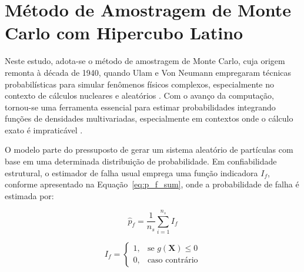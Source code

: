 



\section{Método de Amostragem de Monte Carlo com Hipercubo Latino}

Neste estudo, adota-se o método de amostragem de Monte Carlo, cuja origem remonta à década de 1940, quando Ulam e Von Neumann empregaram técnicas probabilísticas para simular fenômenos físicos complexos, especialmente no contexto de cálculos nucleares e aleatórios \cite{ulam_s_monte_1948}. 
Com o avanço da computação, tornou-se uma ferramenta essencial para estimar probabilidades integrando funções de densidades multivariadas, especialmente em contextos onde o cálculo exato é impraticável \cite{song_monte_2023}. 

O modelo parte do pressuposto de gerar um sistema aleatório de partículas com base em uma determinada distribuição de probabilidade. 
Em confiabilidade estrutural, o estimador de falha usual emprega uma função indicadora $I_f$, conforme apresentado na Equação~\eqref{eq:p_f_sum}, onde a probabilidade de falha é estimada por:

\begin{equation}
\label{eq:p_f_sum}
\hat{p}_f = \frac{1}{n_s} \sum_{i=1}^{n_s} I_f
\end{equation}

\begin{equation}
\label{eq:indicator}
I_f =
\begin{cases}
1, & \text{se } g(\mathbf{X}) \leq 0 \\
0, & \text{caso contrário}
\end{cases}
\end{equation}

